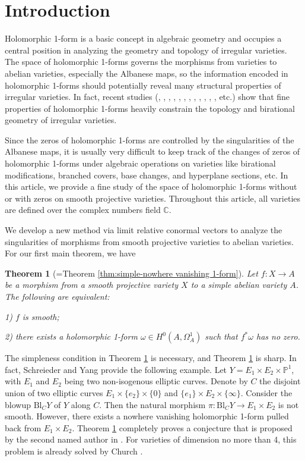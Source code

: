 \documentclass[a4paper,12pt,reqno]{amsart}
\newtheorem{theorem}{Theorem}[section]
\theoremstyle{question}
\theoremstyle{definition}
\theoremstyle{remark}
\theoremstyle{cited}
\theoremstyle{citeddef}
\begin{document}
\section{Introduction}

Holomorphic 1-form is a basic concept in algebraic geometry and occupies a central position in analyzing the geometry and topology of  irregular varieties. The space of holomorphic 1-forms governs the morphisms from varieties to abelian varieties, especially the Albanese maps, so the information encoded in holomorphic 1-forms should potentially reveal many structural properties of irregular varieties. In fact, recent studies  (\cite{CCH25}, \cite{Chu24}, \cite{DHL24}, \cite{HK05}, \cite{Hao24}, \cite{HS21}, \cite{Kot22}, \cite{LZ05},  \cite{Pie25}, \cite{PS14}, \cite{Sch21}, \cite{SY25}, etc.) show that fine properties of holomorphic 1-forms heavily constrain the topology and birational geometry of irregular varieties. 

Since the zeros of holomorphic 1-forms are controlled by the singularities of the Albanese maps, it is usually very difficult to keep track of the changes of zeros of holomorphic 1-forms under algebraic operations on varieties like birational modifications, branched covers, base changes, and  hyperplane sections, etc. In this article, we provide a fine study of the space of holomorphic 1-forms without or with zeros on smooth projective varieties. Throughout this article, all varieties are defined over the complex numbers field $\mathbb{C}$. 

We develop a new method via limit relative conormal vectors to analyze the singularities of morphisms from smooth projective varieties to abelian varieties. For our first main theorem, we have
\begin{theorem}[{=Theorem \ref{thm:simple-nowhere vanishing 1-form}}]\label{thm:simple-smooth}
    Let $f\colon X\to A$ be a morphism from a smooth projective variety $X$ to a simple abelian variety $A$. The following are equivalent:

    1) $f$ is smooth;
    
    2) there exists a holomorphic 1-form $\omega\in H^0(A, \Omega^1_A)$ such that $f^*\omega$ has no zero.
\end{theorem}

The simpleness condition in Theorem \ref{thm:simple-smooth}  is necessary, and Theorem \ref{thm:simple-smooth} is sharp.  In fact, Schreieder and Yang \cite{SY25} provide the following example. Let $Y=E_1\times E_2\times \mathbb{P}^1$, with $E_1$ and $E_2$ being two non-isogenous elliptic curves. Denote by $C$ the disjoint union of two elliptic curves $E_1\times \{e_2\}\times \{0\}$ and $\{e_1\}\times E_2\times \{\infty\}$. Consider the blowup $\text{Bl}_{C}Y$ of $Y$ along $C$. Then the natural morphism $\pi\colon \text{Bl}_{C}Y \to E_1\times E_2$ is not smooth. However, there exists a nowhere vanishing holomorphic 1-form pulled back from $E_1\times E_2$. Theorem \ref{thm:simple-smooth}  completely proves a conjecture that is proposed by the second named author in \cite[Conjecture 1.5]{Hao24}. For varieties of dimension no more than 4, this problem is already solved by Church \cite[Theorem D]{Chu26}. 
\end{document}
